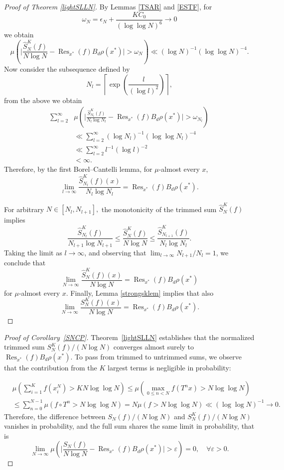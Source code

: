 \documentclass[11pt,twoside,a4paper,reqno]{amsart}
\newcommand{\Res}{\operatorname{Res}}
\begin{document}
\begin{proof}[Proof of Theorem \ref{lightSLLN}]
By Lemmas \ref{TSAR} and \ref{ESTF}, for $$\omega_N=\epsilon_N+\frac{KC_0}{(\log\log N)^6}\to 0$$ we obtain
$$
\mu\left(\biggl| \frac{\hat{S}_N^K(f)}{N \log N}-\operatorname{Res}_{x^*}(f)B_d \rho(x^*) \biggr| >\omega_N \right) \ll (\log N)^{-1} (\log \log N)^{-4}.
$$
Now consider the subsequence defined by
$$N_l = \left\lceil \exp\left(\frac{l}{(\log l)^2}\right) \right\rceil,$$
from the above we obtain
\begin{align*}
\sum_{l=2}^\infty & \mu\left(\biggl|\frac{\hat{S}_{N_l}^K(f)}{N_l \log N_l}-\operatorname{Res}_{x^*}(f)B_d \rho(x^*) \biggr|>\omega_{N_l} \right)\\
& \ll \sum_{l=2}^\infty (\log N_l)^{-1}(\log\log N_l)^{-4}\\
&\ll\sum_{l=2}^{\infty} l^{-1}(\log l)^{-2}\\
&< \infty.
\end{align*}
Therefore, by the first Borel--Cantelli lemma, for $\mu$-almost every $x,$
$$
\lim_{l\to \infty} \frac{\hat{S}_{N_l}^K(f)(x)}{N_l \log N_l} = \Res_{x^*}(f)B_d \rho(x^*).
$$

For arbitrary $N \in [N_l, N_{l+1}],$ the monotonicity of the trimmed sum $\hat{S}_N^K(f)$ implies
$$
\frac{\hat{S}_{N_l}^K(f)}{N_{l+1} \log N_{l+1}} \leq \frac{\hat{S}_N^K(f)}{N \log N} \leq \frac{\hat{S}_{N_{l+1}}^K(f)}{N_l \log N_l}.
$$
Taking the limit as $l \to \infty$, and observing that $\lim_{l \to \infty}N_{l+1}/N_l = 1$, we conclude that
$$
\lim_{N \to \infty} \frac{\hat{S}_N^K(f)(x)}{N \log N} = \operatorname{Res}_{x^*}(f)B_d \rho(x^*)
$$
for $\mu$-almost every $x$. Finally, Lemma \ref{strongsklem} implies that also
$$
\lim_{N \to \infty} \frac{S_N^K(f)(x)}{N \log N} = \operatorname{Res}_{x^*}(f)B_d \rho(x^*).
$$
\end{proof}




\begin{proof}[Proof of Corollary~\ref{SNCP}]
Theorem~\ref{lightSLLN} establishes that the normalized trimmed sum $S_N^K(f)/(N \log N)$ converges almost surely to $\operatorname{Res}_{x^*}(f)B_d \rho(x^*) $. To pass from trimmed to untrimmed sums, we observe that the contribution from the $K$ largest terms is negligible in probability:

\begin{align*}
&\mu\left(\sum_{i=1}^{K} f(x_i^N)> KN \log \log N \right)\leq \mu\left(\max_{0\le n<N}f(T^nx)>N\log\log N
\right)\\ &\leq\sum_{n=0}^{N-1}\mu\left(f\circ T^n>N\log\log N\right)=
N\mu\left(f>N\log\log N\right)\ll (\log \log N)^{-1} \to 0.
\end{align*}
Therefore, the difference between $S_N(f)/(N \log N)$ and $S_N^K(f)/(N \log N)$ vanishes in probability, and the full sum shares the same limit in probability, that is
$$
\lim_{N \to \infty} \mu\left( \biggl| \frac{S_N(f)}{N \log N}-\operatorname{Res}_{x^*}(f)B_d \rho(x^*)\biggr|> \varepsilon \right) = 0, \quad \forall \varepsilon > 0.
$$
\end{proof}
\end{document}
